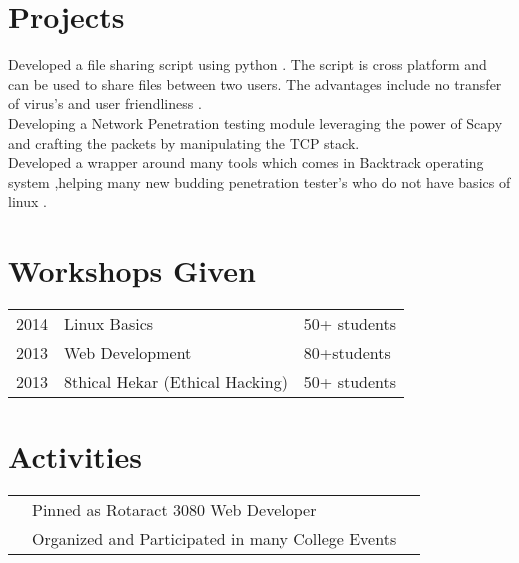 \documentclass[]{deedy-resume-openfont}
\begin{document}
\begin{minipage}[t]{0.66\textwidth}
\begin{tabular}{rll}
\end{tabular}
\sectionsep


\section{Projects}
Developed a file sharing script using python . The script is cross platform and can be used to share files between two users. The advantages include no transfer of virus's and user friendliness .  \\
Developing a Network Penetration testing module leveraging the power of Scapy and crafting the packets by manipulating the TCP stack.\\
Developed a wrapper around many tools which comes in Backtrack operating system ,helping many new budding penetration tester's who do not have basics of linux .\\
\sectionsep
\section{Workshops Given }
\begin{tabular}{rll}
2014	     & Linux Basics  & 50+ students\\
2013	     & Web Development  & 80+students\\
2013	     & 8thical Hekar (Ethical Hacking)   & 50+ students\\
\end{tabular}
\sectionsep
\section{Activities }
\begin{tabular}{rll}
 & Pinned as Rotaract 3080 Web Developer  & \\
 & Organized and Participated in many College Events & \\


\end{tabular}
\sectionsep
\end{minipage} 
\end{document}
